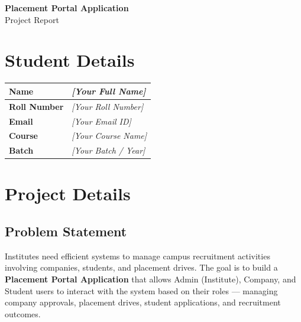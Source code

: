 \documentclass[12pt,a4paper]{article}
\begin{document}
\begin{center}
    {\LARGE \textbf{Placement Portal Application}} \\[6pt]
    {\large Project Report} \\[12pt]
\end{center}

\section{Student Details}

\begin{tabularx}{\textwidth}{|l|X|}
\hline
\textbf{Name}           & \textit{[Your Full Name]}        \\ \hline
\textbf{Roll Number}    & \textit{[Your Roll Number]}      \\ \hline
\textbf{Email}          & \textit{[Your Email ID]}         \\ \hline
\textbf{Course}         & \textit{[Your Course Name]}      \\ \hline
\textbf{Batch}          & \textit{[Your Batch / Year]}     \\ \hline
\end{tabularx}

\section{Project Details}

\subsection{Problem Statement}
Institutes need efficient systems to manage campus recruitment activities involving
companies, students, and placement drives. The goal is to build a \textbf{Placement
Portal Application} that allows Admin (Institute), Company, and Student users to
interact with the system based on their roles --- managing company approvals,
placement drives, student applications, and recruitment outcomes.
\end{document}
